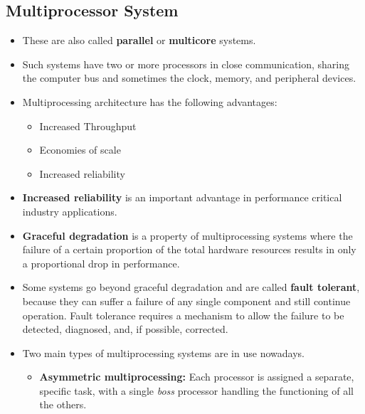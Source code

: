 \documentclass{article}
\theoremstyle{plain}
\theoremstyle{definition}
\begin{document}
\subsection{Multiprocessor System}

\begin{itemize}
    \item These are also called \textbf{parallel} or \textbf{multicore} systems.
    
    \item Such systems have two or more processors in close communication, sharing the computer bus and sometimes the clock, memory, and peripheral devices.
    
    \item Multiprocessing architecture has the following advantages:
    
    \begin{itemize}
        \item Increased Throughput
        
        \item Economies of scale
        
        \item Increased reliability
    \end{itemize}
    
    \item \textbf{Increased reliability} is an important advantage in performance critical industry applications. 
    
    \item \textbf{Graceful degradation} is a property of multiprocessing systems where the failure of a certain proportion of the total hardware resources results in only a proportional drop in performance.
    
    \item Some systems go beyond graceful degradation and are called \textbf{fault tolerant}, because they can suffer a failure of any single component and still continue operation. Fault tolerance requires a mechanism to allow the failure to be detected, diagnosed, and, if possible, corrected.
    
    \item Two main types of multiprocessing systems are in use nowadays. 
    \begin{itemize}
        \item \textbf{Asymmetric multiprocessing:} Each processor is assigned a separate, specific task, with a single \textit{boss} processor handling the functioning of all the others. 
        

\end{itemize}
\end{itemize}
\end{document}
